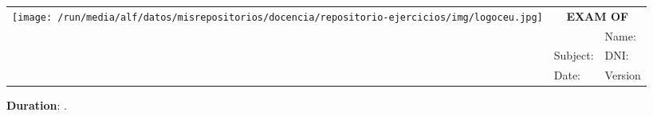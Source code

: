 \documentclass[a4paper]{article}
\makeatletter
\newcommand{\myTitle}{\@Title}
\newcommand{\mySubject}{\@Subject}
\newcommand{\myDegree}{\@Degree}
\newcommand{\myDate}{\@Date}
\newcommand{\myVersion}{\@Version}
\newcommand{\myTime}{\@Time}
\makeatother
\begin{document}
\begin{center}
\doublespacing
\sffamily
\begin{tabular}{|p{}|p{}|p{}|}
\hline
\multirow{4}{*}{\texttt{[image: /run/media/alf/datos/misrepositorios/docencia/repositorio-ejercicios/img/logoceu.jpg]}} & \multicolumn{2}{c|}{\LARGE \textbf{EXAM OF \myTitle}} \\
\cline{2-3}
& \myDegree & Name: \\
\cline{2-3}
& Subject: \mySubject & DNI: \\
\cline{2-3}
& Date: \myDate & Version \myVersion\\
\hline
\end{tabular}
\end{center}

\noindent\textbf{Duration}: \myTime. \vskip 1cm

\begin{enumerate}[leftmargin=*]

\end{enumerate}
\end{document}
